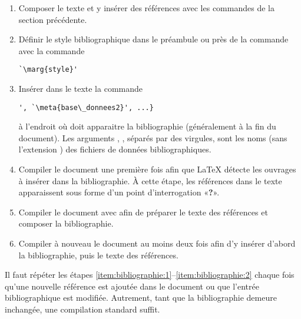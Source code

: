 \begin{enumerate}
\item Composer le texte et y insérer des références avec les commandes
  de la section précédente.
\item Définir le style bibliographique dans le préambule ou près de la
  commande \cmdprint{} avec la commande
\begin{lstlisting}
`\marg{style}'
\end{lstlisting}
\item Insérer dans le texte la commande
\begin{lstlisting}
', `\meta{base\_donnees2}', ...}
\end{lstlisting}
  à l'endroit où doit apparaitre la bibliographie (généralement à la
  fin du document). Les arguments ,
  , séparés par des virgules, sont les noms (sans
  l'extension ) des fichiers de données bibliographiques.
\item \label{item:bibliographie:1} Compiler le document une première
  fois afin que {\LaTeX} détecte les ouvrages à insérer dans la
  bibliographie. À cette étape, les références dans le texte
  apparaissent sous forme d'un point d'interrogation «\textbf{?}».
\item Compiler le document avec {\BibTeX} afin de préparer le texte
  des références et composer la bibliographie.
\item \label{item:bibliographie:2} Compiler à nouveau le document au
  moins deux fois afin d'y insérer d'abord la bibliographie, puis le
  texte des références.
\end{enumerate}

Il faut répéter les étapes
\ref*{item:bibliographie:1}--\ref*{item:bibliographie:2} chaque fois
qu'une nouvelle référence est ajoutée dans le document ou que l'entrée
bibliographique est modifiée. Autrement, tant que la bibliographie
demeure inchangée, une compilation standard suffit.

